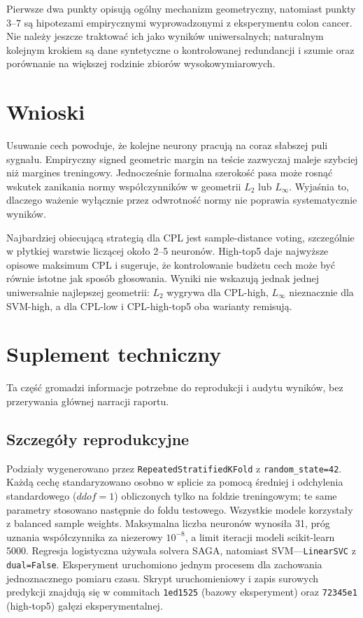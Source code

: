 \documentclass[11pt,a4paper]{article}
\begin{document}
Pierwsze dwa punkty opisują ogólny mechanizm geometryczny, natomiast punkty 3--7 są hipotezami empirycznymi
wyprowadzonymi z eksperymentu colon cancer. Nie należy jeszcze traktować ich jako wyników uniwersalnych;
naturalnym kolejnym krokiem są dane syntetyczne o kontrolowanej redundancji i szumie oraz porównanie na
większej rodzinie zbiorów wysokowymiarowych.

\section{Wnioski}

Usuwanie cech powoduje, że kolejne neurony pracują na coraz słabszej puli sygnału. Empiryczny signed geometric
margin na teście zazwyczaj maleje szybciej niż margines treningowy. Jednocześnie formalna szerokość pasa może
rosnąć wskutek zanikania normy współczynników w geometrii $L_2$ lub $L_\infty$. Wyjaśnia to, dlaczego ważenie
wyłącznie przez odwrotność normy nie poprawia systematycznie wyników.

Najbardziej obiecującą strategią dla CPL jest sample-distance voting, szczególnie w płytkiej warstwie liczącej
około 2--5 neuronów. High-top5 daje najwyższe opisowe maksimum CPL i sugeruje, że kontrolowanie budżetu cech
może być równie istotne jak sposób głosowania. Wyniki nie wskazują jednak jednej uniwersalnie najlepszej
geometrii: $L_2$ wygrywa dla CPL-high, $L_\infty$ nieznacznie dla SVM-high, a dla CPL-low i CPL-high-top5 oba
warianty remisują.

\clearpage
\appendix
\section{Suplement techniczny}

Ta część gromadzi informacje potrzebne do reprodukcji i audytu wyników, bez przerywania głównej narracji
raportu.

\subsection{Szczegóły reprodukcyjne}

Podziały wygenerowano przez \texttt{RepeatedStratifiedKFold} z \texttt{random\_state=42}. Każdą cechę
standaryzowano osobno w splicie za pomocą średniej i odchylenia standardowego ($ddof=1$) obliczonych tylko
na foldzie treningowym; te same parametry stosowano następnie do foldu testowego. Wszystkie modele korzystały
z balanced sample weights. Maksymalna liczba neuronów wynosiła 31, próg uznania współczynnika za niezerowy
$10^{-8}$, a limit iteracji modeli scikit-learn 5000. Regresja logistyczna używała solvera SAGA, natomiast
SVM---\texttt{LinearSVC} z \texttt{dual=False}. Eksperyment uruchomiono jednym procesem dla zachowania
jednoznacznego pomiaru czasu. Skrypt uruchomieniowy i zapis surowych predykcji znajdują się w commitach
\texttt{1ed1525} (bazowy eksperyment) oraz \texttt{72345e1} (high-top5) gałęzi eksperymentalnej.
\end{document}
